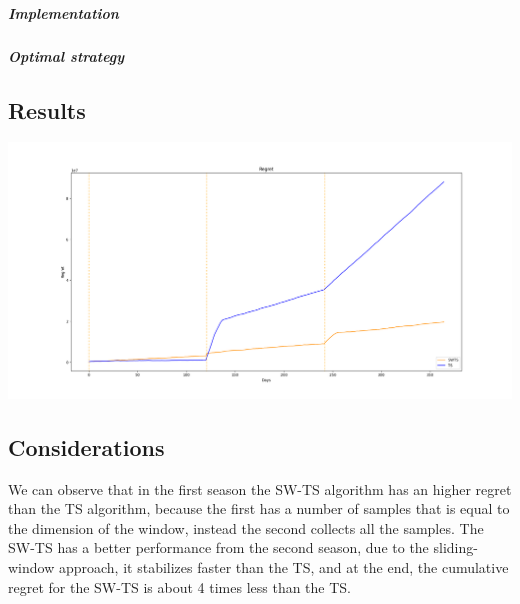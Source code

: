 \subparagraph{Implementation} 
\subparagraph{Optimal strategy}

\subsection*{Results}
\begin{center}
	\includegraphics[scale=0.30]{Images/n7}
\end{center}
\subsection*{Considerations}
We can observe that in the first season the SW-TS algorithm has an higher regret than the TS algorithm, because the first has a number of samples that is equal to the dimension of the window, instead the second collects all the samples. The SW-TS has a better performance from the second season, due to the sliding-window approach, it stabilizes faster than the TS, and at the end, the cumulative regret for the SW-TS is about 4 times less than the TS.